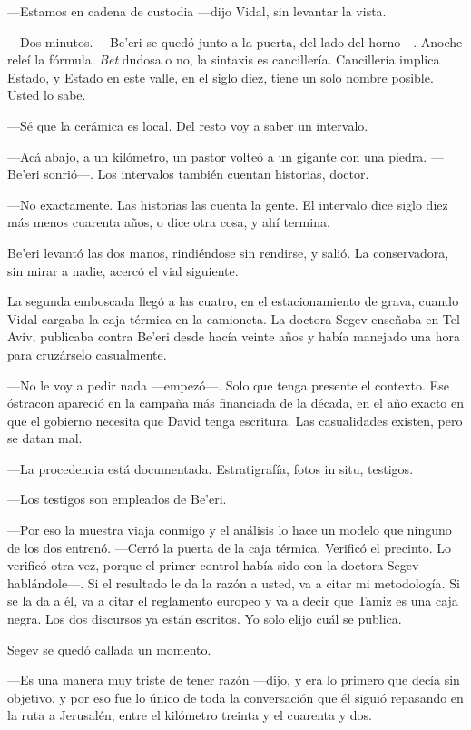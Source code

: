 ---Estamos en cadena de custodia ---dijo Vidal, sin levantar la vista.

---Dos minutos. ---Be'eri se quedó junto a la puerta, del lado del horno---. Anoche releí la fórmula. \textit{Bet} dudosa o no, la sintaxis es cancillería. Cancillería implica Estado, y Estado en este valle, en el siglo diez, tiene un solo nombre posible. Usted lo sabe.

---Sé que la cerámica es local. Del resto voy a saber un intervalo.

---Acá abajo, a un kilómetro, un pastor volteó a un gigante con una piedra. ---Be'eri sonrió---. Los intervalos también cuentan historias, doctor.

---No exactamente. Las historias las cuenta la gente. El intervalo dice siglo diez más menos cuarenta años, o dice otra cosa, y ahí termina.

Be'eri levantó las dos manos, rindiéndose sin rendirse, y salió. La conservadora, sin mirar a nadie, acercó el vial siguiente.

La segunda emboscada llegó a las cuatro, en el estacionamiento de grava, cuando Vidal cargaba la caja térmica en la camioneta. La doctora Segev enseñaba en Tel Aviv, publicaba contra Be'eri desde hacía veinte años y había manejado una hora para cruzárselo casualmente.

---No le voy a pedir nada ---empezó---. Solo que tenga presente el contexto. Ese óstracon apareció en la campaña más financiada de la década, en el año exacto en que el gobierno necesita que David tenga escritura. Las casualidades existen, pero se datan mal.

---La procedencia está documentada. Estratigrafía, fotos in situ, testigos.

---Los testigos son empleados de Be'eri.

---Por eso la muestra viaja conmigo y el análisis lo hace un modelo que ninguno de los dos entrenó. ---Cerró la puerta de la caja térmica. Verificó el precinto. Lo verificó otra vez, porque el primer control había sido con la doctora Segev hablándole---. Si el resultado le da la razón a usted, va a citar mi metodología. Si se la da a él, va a citar el reglamento europeo y va a decir que Tamiz es una caja negra. Los dos discursos ya están escritos. Yo solo elijo cuál se publica.

Segev se quedó callada un momento.

---Es una manera muy triste de tener razón ---dijo, y era lo primero que decía sin objetivo, y por eso fue lo único de toda la conversación que él siguió repasando en la ruta a Jerusalén, entre el kilómetro treinta y el cuarenta y dos.


